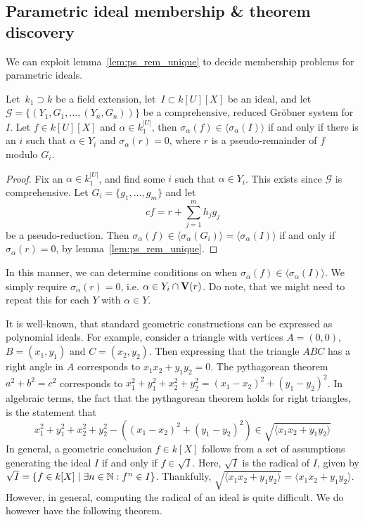 \subsection{Parametric ideal membership \& theorem discovery}\label{sec:ps_div_app}
We can exploit lemma~\ref{lem:ps_rem_unique} to decide membership problems for parametric ideals.

\begin{theorem}
  Let $\,k_{1} \supset k$ be a field extension, let $\,I \subset k[U][X]$ be an ideal, and let $\mathcal G = \{(Y_{1}, G_{1}, \dots, (Y_{n}, G_{n}))\}$ be a comprehensive, reduced Gröbner system for $I$. Let $f \in k[U][X]$ and $\alpha \in k_{1}^{|U|}$, then $\sigma_{\alpha}(f) \in \langle \sigma_{\alpha}(I) \rangle$ if and only if there is an $i$ such that $\alpha \in Y_{i}$ and $\sigma_{\alpha}(r) = 0$, where $r$ is a pseudo-remainder of $f$ modulo $G_{i}$.
\end{theorem}
\begin{proof}
  Fix an $\alpha \in k_{1}^{|U|}$, and find some $i$ such that $\alpha \in Y_{i}$. This exists since $\mathcal G$ is comprehensive. Let $G_{i} = \{g_{1}, \dots, g_{m}\}$ and let
  \[c f = r + \sum_{j=1}^{m} h_{j} g_{j}\]
  be a pseudo-reduction. Then $\sigma_{\alpha}(f) \in \langle \sigma_{\alpha}(G_{i}) \rangle = \langle \sigma_{\alpha}(I) \rangle$ if and only if $\sigma_{\alpha}(r) = 0$, by lemma~\ref{lem:ps_rem_unique}.
\end{proof}

In this manner, we can determine conditions on when $\sigma_{\alpha}(f) \in \langle \sigma_{\alpha}(I) \rangle$. We simply require $\sigma_{\alpha}(r) = 0$, i.e. $\alpha \in Y_{i} \cap \operatorname{\mathbf V}(r)$. Do note, that we might need to repeat this for each $Y$ with $\alpha \in Y$.

It is well-known, that standard geometric constructions can be expressed as polynomial ideals. For example, consider a triangle with vertices $A = (0, 0)$, $B = (x_{1}, y_{1})$ and $C = (x_{2}, y_{2})$. Then expressing that the triangle $ABC$ has a right angle in $A$ corresponds to $x_{1} x_{2} + y_{1} y_{2} = 0$. The pythagorean theorem $a^{2} + b^{2} = c^{2}$ corresponds to $x_{1}^{2} + y_{1}^{2} + x_{2}^{2} + y_{2}^{2} = {(x_{1} - x_{2})}^{2} + {(y_{1} - y_{2})}^{2}$. In algebraic terms, the fact that the pythagorean theorem holds for right triangles, is the statement that
\[x_{1}^{2} + y_{1}^{2} + x_{2}^{2} + y_{2}^{2} - \left({(x_{1} - x_{2})}^{2} + {(y_{1} - y_{2})}^{2}\right) \in \sqrt{\langle x_{1} x_{2} + y_{1} y_{2} \rangle} \]
In general, a geometric conclusion $f \in k[X]$ follows from a set of assumptions generating the ideal $I$ if and only if $f \in \sqrt{I}$. Here, $\sqrt{I}$ is the radical of $I$, given by $\sqrt{I} = \{f \in k[X] \mid \exists n \in \mathbb{N} : f^{n} \in I\}$. Thankfully, $\sqrt{ \langle x_{1} x_{2} + y_{1} y_{2} \rangle } = \langle x_{1} x_{2} + y_{1} y_{2} \rangle$. However, in general, computing the radical of an ideal is quite difficult. We do however have the following theorem.

